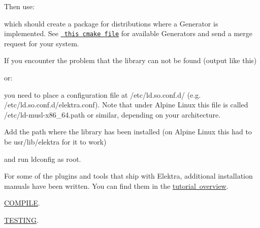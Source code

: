 Then use\+:


\begin{DoxyCode}{0}
\end{DoxyCode}


which should create a package for distributions where a Generator is implemented. See \href{/home/mpranj/workspace/libelektra/scripts/cmake/ElektraPackaging.cmake}{\texttt{ this cmake file}} for available Generators and send a merge request for your system.

If you encounter the problem that the library can not be found (output like this)


\begin{DoxyCode}{0}
\end{DoxyCode}


or\+:


\begin{DoxyCode}{0}
\end{DoxyCode}


you need to place a configuration file at {\ttfamily /etc/ld.so.\+conf.\+d/} (e.\+g. {\ttfamily /etc/ld.so.\+conf.\+d/elektra.conf}). Note that under Alpine Linux this file is called {\ttfamily /etc/ld-\/musl-\/x86\+\_\+64.path} or similar, depending on your architecture.

Add the path where the library has been installed (on Alpine Linux this had to be {\ttfamily usr/lib/elektra} for it to work)


\begin{DoxyCode}{0}
\end{DoxyCode}


and run {\ttfamily ldconfig} as root.

For some of the plugins and tools that ship with Elektra, additional installation manuals have been written. You can find them in the \mbox{\hyperlink{md_doc_tutorials_README_doc_tutorials_README_md}{tutorial overview}}.


\begin{DoxyItemize}
\item \mbox{\hyperlink{doc_COMPILE_md}{C\+O\+M\+P\+I\+LE}}.
\item \mbox{\hyperlink{doc_TESTING_md}{T\+E\+S\+T\+I\+NG}}. 
\end{DoxyItemize}